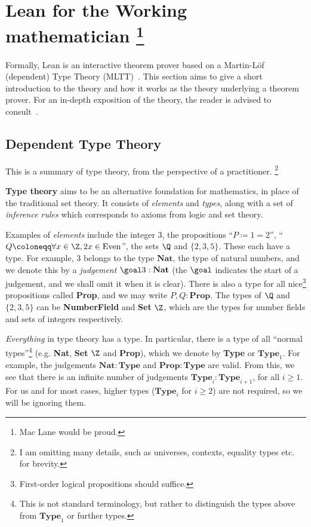 \section{Lean for the Working mathematician \protect\footnote{Mac Lane would be proud.}}

Formally, Lean is an interactive theorem prover based on a Martin-Löf (dependent) Type Theory (MLTT)~\cite{MartinLöf1984}. This section aims to give a short introduction to the theory and how it works as the theory underlying a theorem prover. For an in-depth exposition of the theory, the reader is advised to consult~\cite{Rijke2022}.

\subsection{Dependent Type Theory}

This is a summary of type theory, from the perspective of a practitioner. \footnote{I am omitting many details, such as universes, contexts, equality types etc. for brevity.}

\begin{gtheorem*}
  \textbf{Type theory} aims to be an alternative foundation for mathematics, in place of the traditional set theory. It consists of \textit{elements} and \textit{types}, along with a set of \textit{inference rules} which corresponds to axioms from logic and set theory.
\end{gtheorem*}

Examples of \textit{elements} include the integer \(3\), the propositions ``\(P \coloneqq 1 = 2\)'', ``\(Q \coloneqq \forall x \in \Z, 2x \in \mathrm{Even}\)'', the sets \(\Q\) and \(\{2, 3, 5\}\). These each have a type. For example, \(3\) belongs to the type \(\mathbf{Nat}\), the type of natural numbers, and we denote this by a \textit{judgement} \(\goal 3 : \mathbf{Nat}\) (the \(\goal\) indicates the start of a judgement, and we shall omit it when it is clear). There is also a type for all nice\footnote{First-order logical propositions should suffice.} propositions called \textbf{Prop}, and we may write \(P, Q : \mathbf{Prop}\). The types of \(\Q\) and \(\{2, 3, 5\}\) can be \textbf{NumberField} and \textbf{Set} \(\Z\), which are the types for number fields and sets of integers respectively.

\textit{Everything} in type theory has a type. In particular, there is a type of all ``normal types''\footnote{This is not standard terminology, but rather to distinguish the types above from \(\mathbf{Type}_1\) or further types.} (e.g. \textbf{Nat}, \textbf{Set} \(\Z\) and \textbf{Prop}), which we denote by \textbf{Type} or \(\mathbf{Type}_1\). For example, the judgements \(\mathbf{Nat} : \mathbf{Type}\) and \(\mathbf{Prop} : \mathbf{Type}\) are valid. From this, we see that there is an infinite number of judgements \(\mathbf{Type}_i : \mathbf{Type}_{i + 1}\), for all \(i \geq 1\). For us and for most cases, higher types (\(\mathbf{Type}_i\) for \(i \geq 2\)) are not required, so we will be ignoring them.

